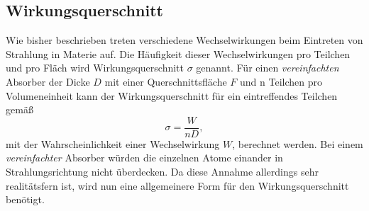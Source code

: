 \subsection{Wirkungsquerschnitt}
\label{subsec:Wirkungsquerschnitt}
Wie bisher beschrieben treten verschiedene Wechselwirkungen beim Eintreten von Strahlung in Materie auf. Die Häufigkeit dieser Wechselwirkungen pro Teilchen und pro Fläch
wird Wirkungsquerschnitt $\sigma$ genannt. 
Für einen \textit{vereinfachten} Absorber der Dicke $D$ mit einer Querschnittsfläche $F$ und n Teilchen pro Volumeneinheit kann der Wirkungsquerschnitt für ein eintreffendes
Teilchen gemäß 
\begin{equation*}
    \sigma = \frac{W}{nD},
\end{equation*}
mit der Wahrscheinlichkeit einer Wechselwirkung $W$, berechnet werden. Bei einem \textit{vereinfachter} Absorber würden die einzelnen Atome einander in Strahlungsrichtung nicht
überdecken. Da diese Annahme allerdings sehr realitätsfern ist, wird nun eine allgemeinere Form für den Wirkungsquerschnitt benötigt.  